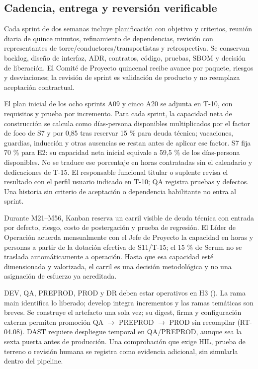 \FloatBarrier
\subsection{Cadencia, entrega y reversión verificable}\label{sec:06-cadencia-entrega-y-reversion-verificable}

Cada sprint de dos semanas incluye planificación con objetivo y criterios, reunión diaria de quince minutos, refinamiento de dependencias, revisión con representantes de torre/conductores/transportistas y retrospectiva. Se conservan backlog, diseño de interfaz, ADR, contratos, código, pruebas, SBOM y decisión de liberación. El Comité de Proyecto quincenal recibe avance por paquete, riesgos y desviaciones; la revisión de sprint es validación de producto y no reemplaza aceptación contractual.

El plan inicial de los ocho sprints A09 y cinco A20 se adjunta en T-10, con requisitos y prueba por incremento. Para cada sprint, la capacidad neta de construcción se calcula como días-persona disponibles multiplicados por el factor de foco de S7 y por 0,85 tras reservar 15 \% para deuda técnica; vacaciones, guardias, inducción y otras ausencias se restan antes de aplicar ese factor. S7 fija 70 \% para E2: su capacidad neta inicial equivale a 59,5 \% de los días-persona disponibles. No se traduce ese porcentaje en horas contratadas sin el calendario y dedicaciones de T-15. El responsable funcional titular o suplente revisa el resultado con el perfil usuario indicado en T-10; QA registra pruebas y defectos. Una historia sin criterio de aceptación o dependencia habilitante no entra al sprint.

Durante M21–M56, Kanban reserva un carril visible de deuda técnica con entrada por defecto, riesgo, costo de postergación y prueba de regresión. El Líder de Operación acuerda mensualmente con el Jefe de Proyecto la capacidad en horas y personas a partir de la dotación efectiva de S11/T-15; el 15 \% de Scrum no se traslada automáticamente a operación. Hasta que esa capacidad esté dimensionada y valorizada, el carril es una decisión metodológica y no una asignación de esfuerzo ya acreditada.

DEV, QA, PREPROD, PROD y DR deben estar operativos en H3 (). La rama main identifica lo liberado; develop integra incrementos y las ramas temáticas son breves. Se construye el artefacto una sola vez; su digest, firma y configuración externa permiten promoción QA $\rightarrow$ PREPROD $\rightarrow$ PROD sin recompilar (RT-04.08). DAST requiere despliegue temporal en QA/PREPROD, aunque sea la sexta puerta antes de producción. Una comprobación que exige HIL, prueba de terreno o revisión humana se registra como evidencia adicional, sin simularla dentro del pipeline.

